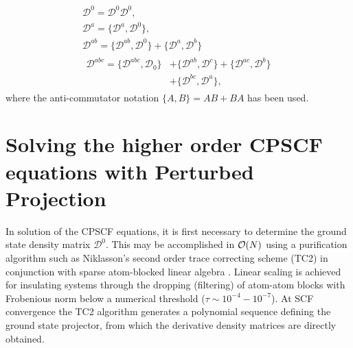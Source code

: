 \documentclass[prl,twocolumn,showpacs,twocolumngrid,superbib]{revtex4}
\def\D{\mathcal{D}}
\begin{document}
\begin{gather}
  \D^{0} =\D^{0} \D^{0},\label{eq:anticommutators1}\\
  \D^{a} =\{\D^{a},\D^{0}\},\label{eq:anticommutators2}\\
  \D^{ab}=\{\D^{ab},\D^{0}\}+\{\D^{a},\D^{b}\}\label{eq:anticommutators3}\\
  \begin{split}
    \D^{abc}=\{\D^{abc},\D_0\}&+\{\D^{ab},\D^{c}\}+\{\D^{ac},\D^{b}\}\\
    &+\{\D^{bc},\D^{a}\}\label{eq:anticommutators4},
  \end{split}
\end{gather}
where the anti-commutator notation $\{A,B\} = AB+BA$ has been used.

\section{Solving the higher order CPSCF equations with Perturbed Projection}

In solution of the CPSCF equations, it is first necessary to determine the ground state density matrix $\mathcal{D}^0$.  This may 
be accomplished in ${\cal O}(N)$ using a purification algorithm such as Niklasson's \cite{ANiklasson02A} 
second order trace correcting scheme (TC2) in conjunction with sparse atom-blocked linear algebra 
\cite{ANiklasson03,MChallacombe00B}.  Linear scaling is achieved for insulating systems through 
the dropping (filtering) of atom-atom blocks with Frobenious norm below a numerical threshold 
($\tau \sim 10^{-4}-10^{-7}$).  At SCF convergence the TC2 algorithm generates a polynomial sequence 
defining the ground state projector, from which the derivative density matrices are directly obtained.
\end{document}
